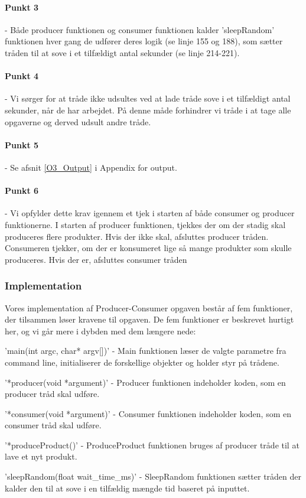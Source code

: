 \paragraph{Punkt 3} - Både producer funktionen og consumer funktionen kalder 'sleepRandom' funktionen hver gang de udfører deres logik (se linje 155 og 188), som sætter tråden til at sove i et tilfældigt antal sekunder (se linje 214-221).
\paragraph{Punkt 4} - Vi sørger for at tråde ikke udsultes ved at lade tråde sove i et tilfældigt antal sekunder, når de har arbejdet. På denne måde forhindrer vi tråde i at tage alle opgaverne og derved udsult andre tråde.
\paragraph{Punkt 5} - Se afsnit \ref{O3_Output} i Appendix for output.
\paragraph{Punkt 6} - Vi opfylder dette krav igennem et tjek i starten af både consumer og producer funktionerne. I starten af producer funktionen, tjekkes der om der stadig skal produceres flere produkter. Hvis der ikke skal, afsluttes producer tråden. Consumeren tjekker, om der er konsumeret lige så mange produkter som skulle produceres. Hvis der er, afsluttes consumer tråden

\subsubsection{Implementation}
\label{O3_Implementation}
Vores implementation af Producer-Consumer opgaven består af fem funktioner, der tilsammen løser kravene til opgaven. De fem funktioner er beskrevet hurtigt her, og vi går mere i dybden med dem længere nede: 
\begin{my_enumerate}
    \item 'main(int argc, char* argv[])' - Main funktionen læser de valgte parametre fra command line, initialiserer de forskellige objekter og holder styr på trådene.
    \item '*producer(void *argument)' - Producer funktionen indeholder koden, som en producer tråd skal udføre. 
    \item '*consumer(void *argument)' - Consumer funktionen indeholder koden, som en consumer tråd skal udføre. 
    \item '*produceProduct()' - ProduceProduct funktionen bruges af producer tråde til at lave et nyt produkt.
    \item 'sleepRandom(float wait_time_ms)' - SleepRandom funktionen sætter tråden der kalder den til at sove i en tilfældig mængde tid baseret på inputtet.
\end{my_enumerate}

